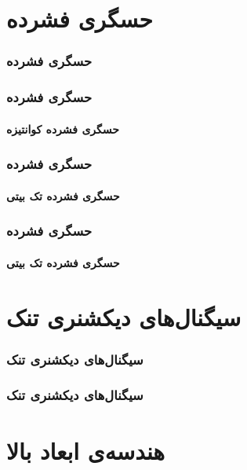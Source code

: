 \begin{frame}
\tableofcontents
\end{frame}


\section{حسگری فشرده\hfill}

\begin{frame}
\frametitle{حسگری فشرده}
\begin{figure}
	\centering
	
\end{figure}
\end{frame}

\begin{frame}
\frametitle{حسگری فشرده}
\framesubtitle{حسگری فشرده کوانتیزه}
\end{frame}

\begin{frame}
\frametitle{حسگری فشرده}
\framesubtitle{حسگری فشرده تک بیتی}
\end{frame}

\begin{frame}
\frametitle{حسگری فشرده}
\framesubtitle{حسگری فشرده تک بیتی}
\end{frame}


\section{سیگنال‌های دیکشنری تنک\hfill}

\begin{frame}
\frametitle{سیگنال‌های دیکشنری تنک}

\end{frame}

\begin{frame}
\frametitle{سیگنال‌های دیکشنری تنک}

\end{frame}

\section{هندسه‌ی ابعاد بالا\hfill}

